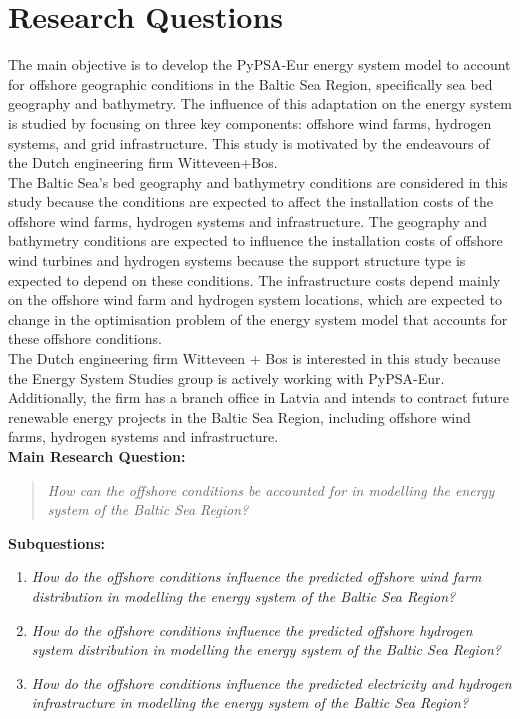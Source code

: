 \chapter{Research Questions}

The main objective is to develop the PyPSA-Eur energy system model to account for offshore geographic conditions in the Baltic Sea Region, specifically sea bed geography and bathymetry. The influence of this adaptation on the energy system is studied by focusing on three key components: offshore wind farms, hydrogen systems, and grid infrastructure. This study is motivated by the endeavours of the Dutch engineering firm Witteveen+Bos.\\

The Baltic Sea's bed geography and bathymetry conditions are considered in this study because the conditions are expected to affect the installation costs of the offshore wind farms, hydrogen systems and infrastructure. The geography and bathymetry conditions are expected to influence the installation costs of offshore wind turbines and hydrogen systems because the support structure type is expected to depend on these conditions. The infrastructure costs depend mainly on the offshore wind farm and hydrogen system locations, which are expected to change in the optimisation problem of the energy system model that accounts for these offshore conditions.\\

The Dutch engineering firm Witteveen + Bos is interested in this study because the Energy System Studies group is actively working with PyPSA-Eur. Additionally, the firm has a branch office in Latvia and intends to contract future renewable energy projects in the Baltic Sea Region, including offshore wind farms, hydrogen systems and infrastructure.\\


\textbf{Main Research Question:}
\begin{quote}
    \emph{How can the offshore conditions be accounted for in modelling the energy system of the Baltic Sea Region?}
\end{quote}

\noindent \textbf{Subquestions:}
\begin{enumerate}
    \item \emph{How do the offshore conditions influence the predicted offshore wind farm distribution in modelling the energy system of the Baltic Sea Region?}
    \item \emph{How do the offshore conditions influence the predicted offshore hydrogen system distribution in modelling the energy system of the Baltic Sea Region?}
    \item \emph{How do the offshore conditions influence the predicted electricity and hydrogen infrastructure in modelling the energy system of the Baltic Sea Region?}
\end{enumerate}
